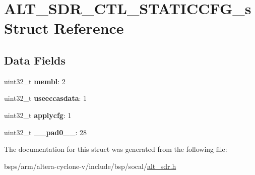 \hypertarget{structALT__SDR__CTL__STATICCFG__s}{}\section{A\+L\+T\+\_\+\+S\+D\+R\+\_\+\+C\+T\+L\+\_\+\+S\+T\+A\+T\+I\+C\+C\+F\+G\+\_\+s Struct Reference}
\label{structALT__SDR__CTL__STATICCFG__s}
\subsection*{Data Fields}
\begin{DoxyCompactItemize}
\item 
\mbox{\label{structALT__SDR__CTL__STATICCFG__s_ad315d3cc62fd4ec551077338dccd496f}} 
uint32\+\_\+t {\bfseries membl}\+: 2
\item 
\mbox{\label{structALT__SDR__CTL__STATICCFG__s_aa622e86763a4fd8df7a4ab7595aaf44b}} 
uint32\+\_\+t {\bfseries useeccasdata}\+: 1
\item 
\mbox{\label{structALT__SDR__CTL__STATICCFG__s_a88b6727012a8313c552ae483b9ade2f1}} 
uint32\+\_\+t {\bfseries applycfg}\+: 1
\item 
\mbox{\label{structALT__SDR__CTL__STATICCFG__s_af3d4cc38d815700ed97d5b2d02bb4d2b}} 
uint32\+\_\+t {\bfseries \+\_\+\+\_\+pad0\+\_\+\+\_\+}\+: 28
\end{DoxyCompactItemize}


The documentation for this struct was generated from the following file\+:\begin{DoxyCompactItemize}
\item 
bsps/arm/altera-\/cyclone-\/v/include/bsp/socal/\mbox{\hyperlink{alt__sdr_8h}{alt\+\_\+sdr.\+h}}\end{DoxyCompactItemize}
